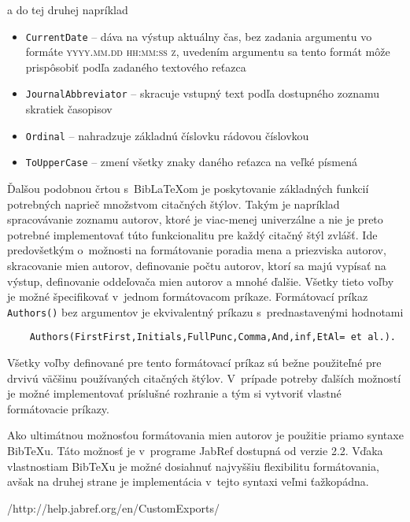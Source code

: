 \documentclass{fithesis3}
\begin{document}
	\noindent a do tej druhej napríklad
	
	\begin{itemize}
	\item \texttt{CurrentDate} -- dáva na výstup aktuálny čas, bez zadania argumentu vo formáte \textsc{yyyy.mm.dd hh:mm:ss z}, uvedením argumentu sa tento formát môže prispôsobiť podľa zadaného textového reťazca
	\item \texttt{JournalAbbreviator} -- skracuje vstupný text podľa dostupného zoznamu skratiek časopisov
	\item \texttt{Ordinal} -- nahradzuje základnú číslovku rádovou číslovkou
	\item \texttt{ToUpperCase} -- zmení všetky znaky daného reťazca na veľké písmená
	\end{itemize}
	
	\noindent Ďalšou podobnou črtou s~BibLaTeXom je poskytovanie základných funkcií potrebných naprieč množstvom citačných štýlov. Takým je napríklad spracovávanie zoznamu autorov, ktoré je viac-menej univerzálne a nie je preto potrebné implementovať túto funkcionalitu pre každý citačný štýl zvlášť. Ide predovšetkým o~možnosti na formátovanie poradia mena a priezviska autorov, skracovanie mien autorov, definovanie počtu autorov, ktorí sa majú vypísať na výstup, definovanie oddeľovača mien autorov a mnohé ďalšie. Všetky tieto voľby je možné špecifikovať v~jednom formátovacom príkaze. Formátovací príkaz \texttt{Authors()} bez argumentov je ekvivalentný príkazu s~prednastavenými hodnotami
	
	\begin{verbatim}
	Authors(FirstFirst,Initials,FullPunc,Comma,And,inf,EtAl= et al.).
	\end{verbatim}
	
	\noindent Všetky voľby definované pre tento formátovací príkaz sú bežne použiteľné pre drvivú väčšinu používaných citačných štýlov. V~prípade potreby ďalších možností je možné implementovať príslušné rozhranie a tým si vytvoriť vlastné formátovacie príkazy.
	
	\noindent Ako ultimátnou možnosťou formátovania mien autorov je použitie priamo syntaxe BibTeXu. Táto možnosť je v~programe JabRef dostupná od verzie 2.2. Vďaka vlastnostiam BibTeXu je možné dosiahnuť najvyššiu flexibilitu formátovania, avšak na druhej strane je implementácia v~tejto syntaxi veľmi ťažkopádna.
	
	/http://help.jabref.org/en/CustomExports/
	
\end{document}
